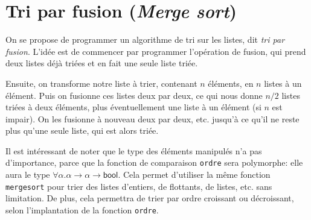 \documentclass[11pt, a4paper]{article}
\begin{document}
\section{Tri par fusion (\emph{Merge sort})}

On se propose de programmer un algorithme de tri sur les listes, dit
\emph{tri par fusion}. L'idée est de commencer par programmer
l'opération de fusion, qui prend deux listes déjà triées et en fait
une seule liste triée.

Ensuite, on transforme notre liste à trier, contenant $n$ éléments, en
$n$ listes à un élément. Puis on fusionne ces listes deux par deux, ce
qui nous donne $n/2$ listes triées à deux éléments, plus
éventuellement une liste à un élément (si $n$ est impair). On les
fusionne à nouveau deux par deux, etc. jusqu'à ce qu'il ne reste plus
qu'une seule liste, qui est alors triée.

Il est intéressant de noter que le type des éléments manipulés n'a pas
d'importance, parce que la fonction de comparaison \texttt{ordre} sera
polymorphe: elle aura le type
$\forall\alpha.\alpha\rightarrow\alpha\rightarrow\textsf{bool}$.  Cela
permet d'utiliser la même fonction \texttt{mergesort} pour trier des
listes d'entiers, de flottants, de listes, etc. sans limitation. De
plus, cela permettra de trier par ordre croissant ou décroissant,
selon l'implantation de la fonction \texttt{ordre}.
\end{document}
